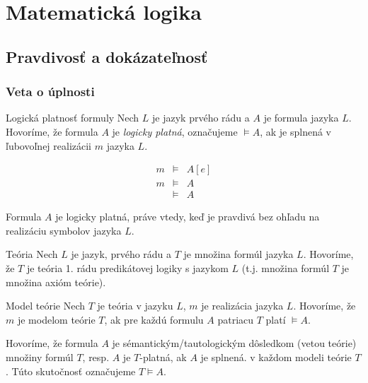 \chapter{Matematická logika}

\section{Pravdivosť a dokázateľnosť}
\subsection{Veta o úplnosti}

\begin{definicia}{Logická platnosť formuly}
    Nech $L$ je jazyk prvého rádu a $A$ je formula jazyka
    $L$. Hovoríme, že formula $A$ je \emph{logicky platná},
    označujeme $\models A$,
    ak je splnená v ľubovoľnej realizácii $m$ jazyka $L$.

    \begin{align*}
        m & \models & A[e] \\
        m & \models & A \\
        & \models & A
    \end{align*}
\end{definicia}

\begin{poznamka}
    Formula $A$ je logicky platná, práve vtedy, keď je pravdivá
    bez ohľadu na realizáciu symbolov jazyka $L$.
\end{poznamka}

\begin{definicia}{Teória}
    Nech $L$ je jazyk, prvého rádu a $T$ je množina formúl
    jazyka $L$. Hovoríme, že $T$ je teória 1. rádu predikátovej logiky
    s jazykom $L$ (t.j. množina formúl $T$ je množina axióm teórie).
\end{definicia}

\begin{definicia}{Model teórie}
    Nech $T$ je teória v jazyku $L$, $m$ je realizácia jazyka $L$.
    Hovoríme, že $m$ je modelom teórie $T$, ak pre každú formulu $A$
    patriacu $T$ platí $\models A$.

    Hovoríme, že formula $A$ je
    sémantickým/tautologickým dôsledkom (vetou teórie) množiny formúl $T$,
    resp. $A$ je $T$-platná, ak $A$ je splnená.
    v každom modeli teórie $T$.
    Túto skutočnosť označujeme $T \models A$.
\end{definicia}

